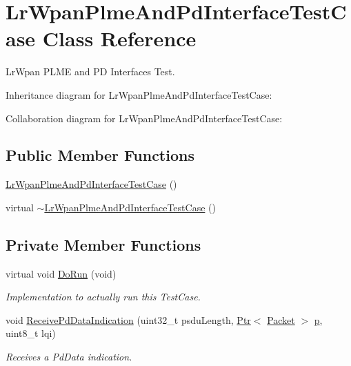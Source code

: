 \hypertarget{classLrWpanPlmeAndPdInterfaceTestCase}{}\section{Lr\+Wpan\+Plme\+And\+Pd\+Interface\+Test\+Case Class Reference}
\label{classLrWpanPlmeAndPdInterfaceTestCase}


Lr\+Wpan P\+L\+ME and PD Interfaces Test.  




Inheritance diagram for Lr\+Wpan\+Plme\+And\+Pd\+Interface\+Test\+Case\+:


Collaboration diagram for Lr\+Wpan\+Plme\+And\+Pd\+Interface\+Test\+Case\+:
\subsection*{Public Member Functions}
\begin{DoxyCompactItemize}
\item 
\hyperlink{classLrWpanPlmeAndPdInterfaceTestCase_a33a04b7f04ea76139dfe04c77d115667}{Lr\+Wpan\+Plme\+And\+Pd\+Interface\+Test\+Case} ()
\item 
virtual \hyperlink{classLrWpanPlmeAndPdInterfaceTestCase_a5234508389ca7b4541328edbe29f527c}{$\sim$\+Lr\+Wpan\+Plme\+And\+Pd\+Interface\+Test\+Case} ()
\end{DoxyCompactItemize}
\subsection*{Private Member Functions}
\begin{DoxyCompactItemize}
\item 
virtual void \hyperlink{classLrWpanPlmeAndPdInterfaceTestCase_a2d79b8be9839f74b689ac04a8c5e18ce}{Do\+Run} (void)
\begin{DoxyCompactList}\small\item\em Implementation to actually run this Test\+Case. \end{DoxyCompactList}\item 
void \hyperlink{classLrWpanPlmeAndPdInterfaceTestCase_ae5a3b982d12af5ca486b561e29e07c40}{Receive\+Pd\+Data\+Indication} (uint32\+\_\+t psdu\+Length, \hyperlink{classns3_1_1Ptr}{Ptr}$<$ \hyperlink{classns3_1_1Packet}{Packet} $>$ \hyperlink{lte__link__budget__x2__handover__measures_8m_ac9de518908a968428863f829398a4e62}{p}, uint8\+\_\+t lqi)
\begin{DoxyCompactList}\small\item\em Receives a Pd\+Data indication. \end{DoxyCompactList}\end{DoxyCompactItemize}

